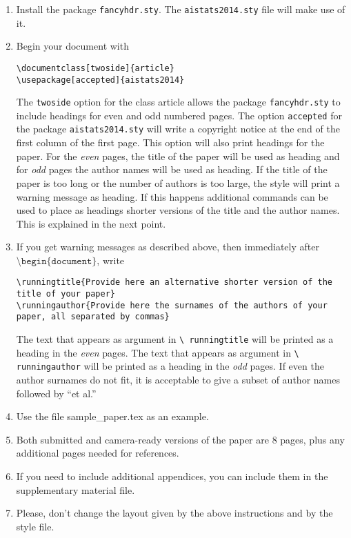 \documentclass[twoside]{article}
\begin{document}
\begin{enumerate}
    \item Install the package \texttt{fancyhdr.sty}. The
    \texttt{aistats2014.sty} file will make use of it.
    \item Begin your document with
    \begin{flushleft}
    \texttt{\textbackslash documentclass[twoside]\{article\}}\\
    \texttt{\textbackslash usepackage[accepted]\{aistats2014\}}
    \end{flushleft}
    The \texttt{twoside} option for the class article allows the
    package \texttt{fancyhdr.sty} to include headings for even and odd
    numbered pages. The option \texttt{accepted} for the package
    \texttt{aistats2014.sty} will write a copyright notice at the end of
    the first column of the first page. This option will also print
    headings for the paper.  For the \emph{even} pages, the title of
    the paper will be used as heading and for \emph{odd} pages the
    author names will be used as heading.  If the title of the paper
    is too long or the number of authors is too large, the style will
    print a warning message as heading. If this happens additional
    commands can be used to place as headings shorter versions of the
    title and the author names. This is explained in the next point.
    \item  If you get warning messages as described above, then
    immediately after $\texttt{\textbackslash
    begin\{document\}}$, write
    \begin{flushleft}
    \texttt{\textbackslash runningtitle\{Provide here an alternative shorter version of the title of your
    paper\}}\\
    \texttt{\textbackslash runningauthor\{Provide here the surnames of the authors of your paper, all separated by
    commas\}}
    \end{flushleft}
    The text that appears as argument in \texttt{\textbackslash
      runningtitle} will be printed as a heading in the \emph{even}
    pages. The text that appears as argument in \texttt{\textbackslash
      runningauthor} will be printed as a heading in the \emph{odd}
    pages.  If even the author surnames do not fit, it is acceptable
    to give a subset of author names followed by ``et al.''

    \item Use the file sample\_paper.tex as an example.

    \item Both submitted and camera-ready versions of the paper are 8
      pages, plus any additional pages needed for references.

    \item If you need to include additional appendices,
      you can include them in the supplementary
      material file.

    \item Please, don't change the layout given by the above
      instructions and by the style file.

\end{enumerate}
\end{document}
